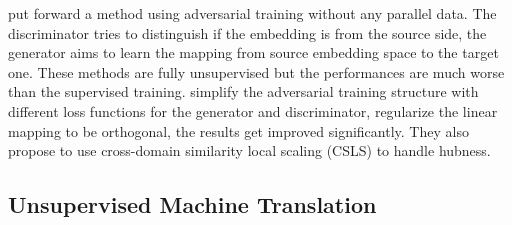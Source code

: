 \cite{zhang2017adversarial} put forward  a method using adversarial training without any parallel data. The discriminator tries to distinguish if the embedding is from the source side, the generator aims to learn the mapping from source embedding space to the target one. These methods are fully unsupervised but the performances are much worse than the supervised training. \cite{DBLP:journals/corr/abs-1710-04087} simplify the adversarial training structure with different loss functions for the generator and discriminator, regularize the linear mapping to be orthogonal, the results get improved significantly. They also propose to use cross-domain similarity local scaling (CSLS) to handle hubness.

\subsection{Unsupervised Machine Translation}

